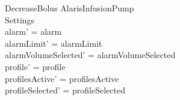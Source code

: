 \begin{schema}{DecreaseBolus}
	\Delta AlarisInfusionPump\\
	
	Settings\\
	\where
	alarm' = alarm\\
	alarmLimit' = alarmLimit\\
	alarmVolumeSelected' = alarmVolumeSelected\\
	profile' = profile\\
	profilesActive' = profilesActive\\  
	  profileSelected' = profileSelected\\
	  

\end{schema}
